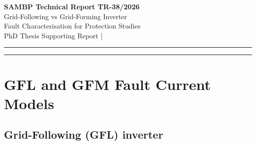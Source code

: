 \documentclass[11pt,a4paper]{article}
\begin{document}
\begin{center}
  {\LARGE\bfseries\color{sambpblue} SAMBP Technical Report TR-38/2026}\\[6pt]
  {\large Grid-Following vs Grid-Forming Inverter\\
    Fault Characterisation for Protection Studies}\\[10pt]
  {\normalsize PhD Thesis Supporting Report \quad|}
\end{center}

\vspace{2pt}\hrule\vspace{8pt}

\begin{abstract}
\noindent
This report characterises the fault current signatures of grid-following (GFL)
and grid-forming (GFM) inverters and quantifies their implications for the SAMBP
distance protection scheme developed in TR-29--TR-37.  GFL inverters suppress
negative-sequence current ($I_2/I_1=0.10$) via inner-loop symmetrical-component
control; GFM inverters have no active suppression ($I_2/I_1=0.40$) and produce a
transient overcurrent of $1.5\times$ for the first 100\,ms.  The 67Q directional
element consequently requires $k_\mathrm{ibr}\geq0.40$ for GFL fleets but only
$k_\mathrm{ibr}\geq0.10$ for GFM fleets --- a 4$\times$ relaxation.  For mixed
fleets, the 67Q threshold is crossed at $f_\mathrm{gfm}\geq0.34$ when
$k_\mathrm{total}=0.20$.  The distance relay apparent impedance error remains
large for both types (333--500\% at $\alpha=0.50$, $k=0.20$), confirming that
87L is indispensable regardless of inverter control mode.  Dependability
$P_\mathrm{dep}=1.000$ is maintained across all GFM fraction scenarios
($k_\mathrm{total}\in[0.06,0.40]$) because 87L operates independently of
control mode.
\end{abstract}

\vspace{4pt}\hrule\vspace{10pt}

\section{GFL and GFM Fault Current Models}
\label{sec:models}

\subsection{Grid-Following (GFL) inverter}
\end{document}
